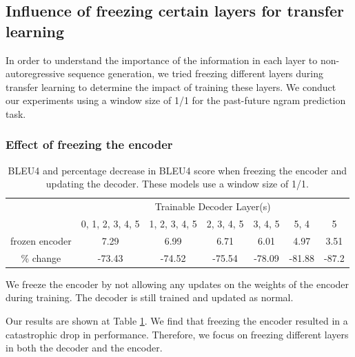 \subsection{Influence of freezing certain layers for transfer learning}
In order to understand the importance of the information in each layer to non-autoregressive sequence generation, we tried freezing different layers during transfer learning to determine the impact of training these layers. We conduct our experiments using a window size of 1/1 for the past-future ngram prediction task.

\subsubsection{Effect of freezing the encoder}

\begin{table}[]
\begin{tabular}{c|c|c|c|c|c|c|}
\cline{2-7}
                                     & \multicolumn{6}{c|}{Trainable Decoder Layer(s)}                          \\ \cline{2-7} 
                                     & 0, 1, 2, 3, 4, 5 & 1, 2, 3, 4, 5 & 2, 3, 4, 5 & 3, 4, 5 & 5, 4   & 5     \\ \hline
\multicolumn{1}{|c|}{frozen encoder} & 7.29             & 6.99          & 6.71       & 6.01    & 4.97   & 3.51  \\
\multicolumn{1}{|c|}{\% change}      & -73.43           & -74.52        & -75.54     & -78.09  & -81.88 & -87.2 \\ \hline
\end{tabular}
\caption{BLEU4 and percentage decrease in BLEU4 score when freezing the encoder and updating the decoder. These models use a window size of 1/1.}
\label{tab:freeze_encoder_results}
\end{table}

We freeze the encoder by not allowing any updates on the weights of the encoder during training. The decoder is still trained and updated as normal. 

Our results are shown at Table \ref{tab:freeze_encoder_results}. We find that freezing the encoder resulted in a catastrophic drop in performance. Therefore, we focus on freezing different layers in both the decoder and the encoder.



